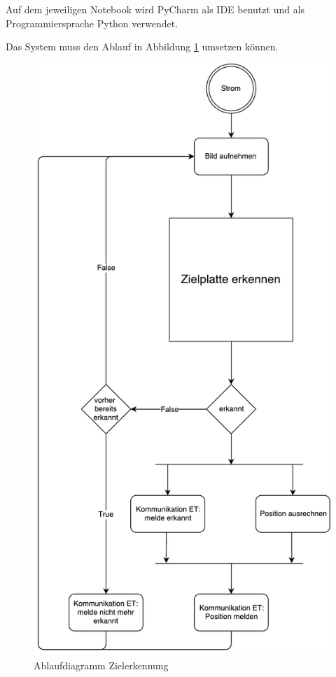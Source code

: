\documentclass[a4paper]{report}
\begin{document}
Auf dem jeweiligen Notebook wird PyCharm als IDE benutzt und als Programmiersprache Python verwendet.

Das System muss den Ablauf in Abbildung \ref{fig:AblaufZielerkennung} umsetzen können.

\begin{figure}[h!]
	\centering
	\includegraphics[keepaspectratio,height=0.8\textheight]{Ablaufdiagramm_ModusOperandi}
	\caption{Ablaufdiagramm Zielerkennung}
	\label{fig:AblaufZielerkennung}
\end{figure}
\end{document}
